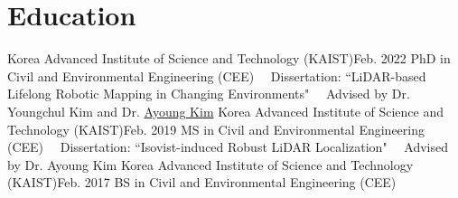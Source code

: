 \section{Education}

  \resumeSubHeadingListStart
    \resumeSubheadingFourLines
      {Korea Advanced Institute of Science and Technology (KAIST)}{Feb. 2022}
      {PhD in Civil and Environmental Engineering (CEE)}{ } 
      {\ \ Dissertation: ``LiDAR-based Lifelong Robotic Mapping in Changing Environments"}{}
      {\ \ Advised by Dr. Youngchul Kim and Dr. \href{https://ayoungk.github.io}{Ayoung Kim}}{}
    \resumeSubheadingFourLines
      {Korea Advanced Institute of Science and Technology (KAIST)}{Feb. 2019}
      {MS in Civil and Environmental Engineering (CEE)}{ } 
      {\ \ Dissertation: ``Isovist-induced Robust LiDAR Localization"}{}
      {\ \ Advised by Dr. Ayoung Kim}{}
    \resumeSubheading
      {Korea Advanced Institute of Science and Technology (KAIST)}{Feb. 2017}
      {BS in Civil and Environmental Engineering (CEE)}{ }
  \resumeSubHeadingListEnd
